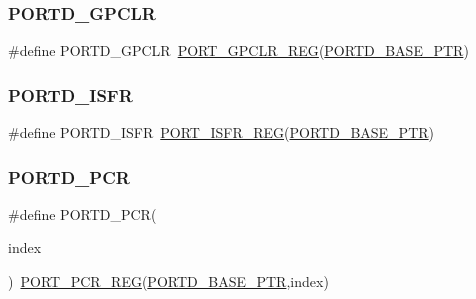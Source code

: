\subsubsection{\texorpdfstring{P\+O\+R\+T\+D\+\_\+\+G\+P\+C\+LR}{PORTD\_GPCLR}}
{\footnotesize\ttfamily \#define P\+O\+R\+T\+D\+\_\+\+G\+P\+C\+LR~\hyperlink{group___p_o_r_t___register___accessor___macros_ga87d8b85c821b383c37cfedaa30eeb27c}{P\+O\+R\+T\+\_\+\+G\+P\+C\+L\+R\+\_\+\+R\+EG}(\hyperlink{group___p_o_r_t___peripheral_ga7f5a263751543810ebfdbde278383276}{P\+O\+R\+T\+D\+\_\+\+B\+A\+S\+E\+\_\+\+P\+TR})}

\mbox{\label{group___p_o_r_t___register___accessor___macros_gafc129a78d36fd096cbf356ddabc9381b}} 
\subsubsection{\texorpdfstring{P\+O\+R\+T\+D\+\_\+\+I\+S\+FR}{PORTD\_ISFR}}
{\footnotesize\ttfamily \#define P\+O\+R\+T\+D\+\_\+\+I\+S\+FR~\hyperlink{group___p_o_r_t___register___accessor___macros_ga71010d47c68b6ac12dbc646ad2cd5a2f}{P\+O\+R\+T\+\_\+\+I\+S\+F\+R\+\_\+\+R\+EG}(\hyperlink{group___p_o_r_t___peripheral_ga7f5a263751543810ebfdbde278383276}{P\+O\+R\+T\+D\+\_\+\+B\+A\+S\+E\+\_\+\+P\+TR})}

\mbox{\label{group___p_o_r_t___register___accessor___macros_gaf8baf1fbb9a157629a0482476cd07a68}} 
\subsubsection{\texorpdfstring{P\+O\+R\+T\+D\+\_\+\+P\+CR}{PORTD\_PCR}}
{\footnotesize\ttfamily \#define P\+O\+R\+T\+D\+\_\+\+P\+CR(\begin{DoxyParamCaption}\item[{}]{index }\end{DoxyParamCaption})~\hyperlink{group___p_o_r_t___register___accessor___macros_ga7a4a549c0ffd6b98b9fbfc0bdcfb5cea}{P\+O\+R\+T\+\_\+\+P\+C\+R\+\_\+\+R\+EG}(\hyperlink{group___p_o_r_t___peripheral_ga7f5a263751543810ebfdbde278383276}{P\+O\+R\+T\+D\+\_\+\+B\+A\+S\+E\+\_\+\+P\+TR},index)}


